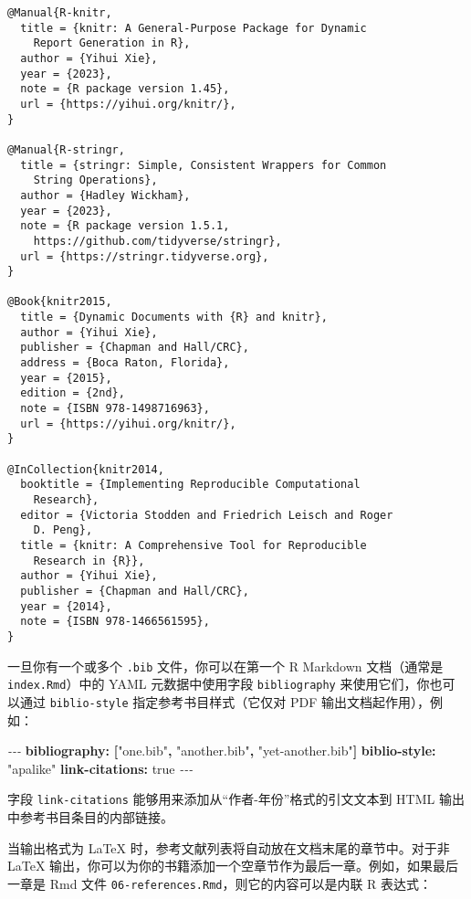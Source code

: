 \documentclass[
  12pt,
]{krantz}
\newenvironment{Shaded}{\begin{snugshade}}{\end{snugshade}}
\newcommand{\AttributeTok}[1]{\textcolor[rgb]{0.13,0.29,0.53}{#1}}
\newcommand{\CharTok}[1]{\textcolor[rgb]{0.31,0.60,0.02}{#1}}
\newcommand{\FunctionTok}[1]{\textcolor[rgb]{0.13,0.29,0.53}{\textbf{#1}}}
\newcommand{\KeywordTok}[1]{\textcolor[rgb]{0.13,0.29,0.53}{\textbf{#1}}}
\newcommand{\PreprocessorTok}[1]{\textcolor[rgb]{0.56,0.35,0.01}{\textit{#1}}}
\newcommand{\StringTok}[1]{\textcolor[rgb]{0.31,0.60,0.02}{#1}}
\theoremstyle{definition}
\theoremstyle{definition}
\theoremstyle{definition}
\theoremstyle{definition}
\theoremstyle{remark}
\begin{document}
\begin{verbatim}
@Manual{R-knitr,
  title = {knitr: A General-Purpose Package for Dynamic
    Report Generation in R},
  author = {Yihui Xie},
  year = {2023},
  note = {R package version 1.45},
  url = {https://yihui.org/knitr/},
}

@Manual{R-stringr,
  title = {stringr: Simple, Consistent Wrappers for Common
    String Operations},
  author = {Hadley Wickham},
  year = {2023},
  note = {R package version 1.5.1,
    https://github.com/tidyverse/stringr},
  url = {https://stringr.tidyverse.org},
}

@Book{knitr2015,
  title = {Dynamic Documents with {R} and knitr},
  author = {Yihui Xie},
  publisher = {Chapman and Hall/CRC},
  address = {Boca Raton, Florida},
  year = {2015},
  edition = {2nd},
  note = {ISBN 978-1498716963},
  url = {https://yihui.org/knitr/},
}

@InCollection{knitr2014,
  booktitle = {Implementing Reproducible Computational
    Research},
  editor = {Victoria Stodden and Friedrich Leisch and Roger
    D. Peng},
  title = {knitr: A Comprehensive Tool for Reproducible
    Research in {R}},
  author = {Yihui Xie},
  publisher = {Chapman and Hall/CRC},
  year = {2014},
  note = {ISBN 978-1466561595},
}
\end{verbatim}

一旦你有一个或多个 \texttt{.bib} 文件，你可以在第一个 R Markdown 文档（通常是 \texttt{index.Rmd}）中的 YAML 元数据中使用字段 \texttt{bibliography} 来使用它们，你也可以通过 \texttt{biblio-style} 指定参考书目样式（它仅对 PDF 输出文档起作用），例如：

\begin{Shaded}
\begin{Highlighting}[]
\PreprocessorTok{{-}{-}{-}}
\FunctionTok{bibliography}\KeywordTok{:}\AttributeTok{ }\KeywordTok{[}\StringTok{"one.bib"}\KeywordTok{,}\AttributeTok{ }\StringTok{"another.bib"}\KeywordTok{,}\AttributeTok{ }\StringTok{"yet{-}another.bib"}\KeywordTok{]}
\FunctionTok{biblio{-}style}\KeywordTok{:}\AttributeTok{ }\StringTok{"apalike"}
\FunctionTok{link{-}citations}\KeywordTok{:}\AttributeTok{ }\CharTok{true}
\PreprocessorTok{{-}{-}{-}}
\end{Highlighting}
\end{Shaded}

字段 \texttt{link-citations} 能够用来添加从``作者-年份''格式的引文文本到 HTML 输出中参考书目条目的内部链接。

当输出格式为 LaTeX 时，参考文献列表将自动放在文档末尾的章节中。对于非 LaTeX 输出，你可以为你的书籍添加一个空章节作为最后一章。例如，如果最后一章是 Rmd 文件 \texttt{06-references.Rmd}，则它的内容可以是内联 R 表达式：
\end{document}

